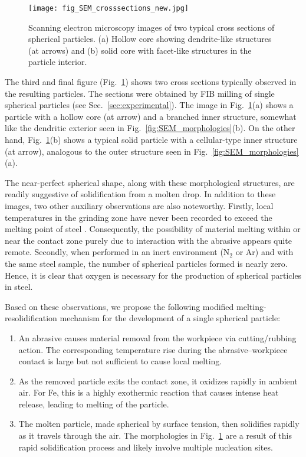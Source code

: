 \documentclass[11pt]{article}
\begin{document}
\begin{figure}
  \centering
  \texttt{[image: fig\_SEM\_crosssections\_new.jpg]}
  \caption{Scanning electron microscopy images of two typical cross sections of spherical particles. (a) Hollow core showing dendrite-like structures (at arrows) and (b) solid core with facet-like structures in the particle interior.}
  \label{fig:SEM_cross_sections}
\end{figure}

The third and final figure (Fig.~\ref{fig:SEM_cross_sections}) shows two cross sections typically observed in the resulting particles. The sections were obtained by FIB milling of single spherical particles (see Sec.~\ref{sec:experimental}). The image in Fig.~\ref{fig:SEM_cross_sections}(a) shows a particle with a hollow core (at arrow) and a branched inner structure, somewhat like the dendritic exterior seen in Fig.~\ref{fig:SEM_morphologies}(b). On the other hand, Fig.~\ref{fig:SEM_cross_sections}(b) shows a typical solid particle with a cellular-type inner structure (at arrow), analogous to the outer structure seen in Fig.~\ref{fig:SEM_morphologies}(a).


The near-perfect spherical shape, along with these morphological structures, are readily suggestive of solidification from a molten drop. In addition to these images, two other auxiliary observations are also noteworthy. Firstly, local temperatures in the grinding zone have never been recorded to exceed the melting point of steel \cite{hwang2003measurement, malkin2007thermal}. Consequently, the possibility of material melting within or near the contact zone purely due to interaction with the abrasive appears quite remote. Secondly, when performed in an inert environment (N$_2$ or Ar) and with the same steel sample, the number of spherical particles formed is nearly zero. Hence, it is clear that oxygen is necessary for the production of spherical particles in steel.


Based on these observations, we propose the following modified melting-resolidification mechanism for the development of a single spherical particle:
\begin{enumerate}
\item An abrasive causes material removal from the workpiece via cutting/rubbing action. The corresponding temperature rise during the abrasive--workpiece contact is large but not sufficient to cause local melting.
\item As the removed particle exits the contact zone, it oxidizes rapidly in ambient air. For Fe, this is a highly exothermic reaction that causes intense heat release, leading to melting of the particle.
\item The molten particle, made spherical by surface tension, then solidifies rapidly as it travels through the air. The morphologies in Fig.~\ref{fig:SEM_cross_sections} are a result of this rapid solidification process and likely involve multiple nucleation sites.
\end{enumerate}
\end{document}
